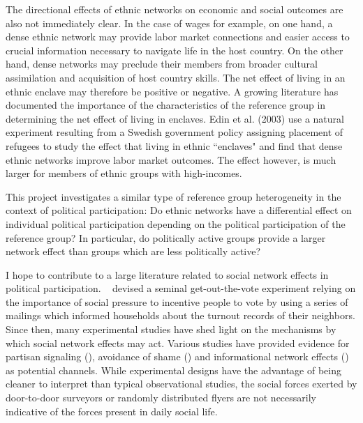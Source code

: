 \documentclass[11pt, oneside]{article}   	%
\begin{document}
The directional effects of ethnic networks on economic and social outcomes are also not immediately clear. In the case of wages for example, on one hand, a dense ethnic network may provide labor market connections and easier access to crucial information necessary to navigate life in the host country. On the other hand, dense networks may preclude their members from broader cultural assimilation and acquisition of host country skills. The net effect of living in an ethnic enclave may therefore be positive or negative. A growing literature has documented the importance of the characteristics of the reference group in determining the net effect of living in enclaves. Edin et al. (2003) use a natural experiment resulting from a Swedish government policy assigning placement of refugees to study the effect that living in ethnic ``enclaves" and find that dense ethnic networks improve labor market outcomes. The effect however, is much larger for members of ethnic groups with high-incomes. 

This project investigates a similar type of reference group heterogeneity in the context of political participation: Do ethnic networks have a differential effect on individual political participation depending on the political participation of the reference group? In particular, do politically active groups provide a larger network effect than groups which are less politically active?

I hope to contribute to a large literature related to social network effects in political participation. ~\cite{Gerber2008} devised a seminal get-out-the-vote experiment relying on the importance of social pressure to incentive people to vote by using a series of mailings which informed households about the turnout records of their neighbors. Since then, many experimental studies have shed light on the mechanisms by which social network effects may act. Various studies have provided evidence for partisan signaling (\cite{Perez-Truglia2017}), avoidance of shame (\cite{DellaVigna2016}) and informational network effects (\cite{Fafchamps2017}) as potential channels. While experimental designs have the advantage of being cleaner to interpret than typical observational studies, the social forces exerted by door-to-door surveyors or randomly distributed flyers are not necessarily indicative of the forces present in daily social life. 
\end{document}
